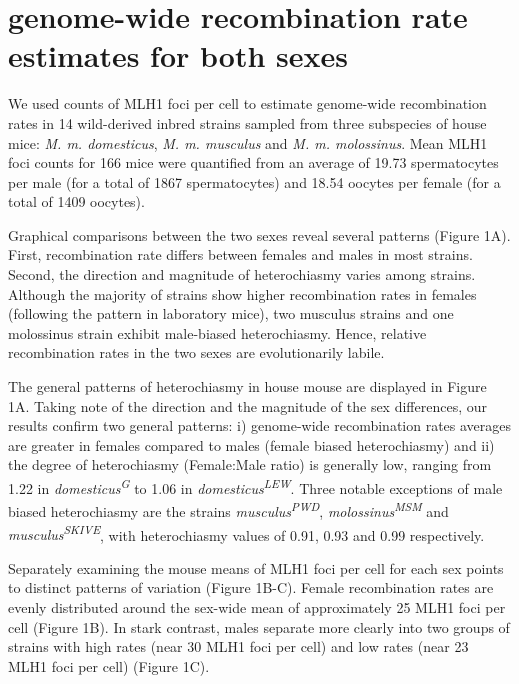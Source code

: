 \documentclass[]{article}
\begin{document}
\section{genome-wide recombination rate estimates for both
sexes}\label{genome-wide-recombination-rate-estimates-for-both-sexes}

We used counts of MLH1 foci per cell to estimate genome-wide
recombination rates in 14 wild-derived inbred strains sampled from three
subspecies of house mice: \emph{M. m. domesticus}, \emph{M. m. musculus}
and \emph{M. m. molossinus}. Mean MLH1 foci counts for 166 mice were
quantified from an average of 19.73 spermatocytes per male (for a total
of 1867 spermatocytes) and 18.54 oocytes per female (for a total of 1409
oocytes).

Graphical comparisons between the two sexes reveal several patterns
(Figure 1A). First, recombination rate differs between females and males
in most strains. Second, the direction and magnitude of heterochiasmy
varies among strains. Although the majority of strains show higher
recombination rates in females (following the pattern in laboratory
mice), two musculus strains and one molossinus strain exhibit
male-biased heterochiasmy. Hence, relative recombination rates in the
two sexes are evolutionarily labile.

The general patterns of heterochiasmy in house mouse are displayed in
Figure 1A. Taking note of the direction and the magnitude of the sex
differences, our results confirm two general patterns: i) genome-wide
recombination rates averages are greater in females compared to males
(female biased heterochiasmy) and ii) the degree of heterochiasmy
(Female:Male ratio) is generally low, ranging from 1.22 in
\emph{domesticus\textsuperscript{G}} to 1.06 in
\emph{domesticus\textsuperscript{LEW}}. Three notable exceptions of male
biased heterochiasmy are the strains
\emph{musculus\textsuperscript{PWD}},
\emph{molossinus\textsuperscript{MSM}} and
\emph{musculus\textsuperscript{SKIVE}}, with heterochiasmy values of
0.91, 0.93 and 0.99 respectively.

Separately examining the mouse means of MLH1 foci per cell for each sex
points to distinct patterns of variation (Figure 1B-C). Female
recombination rates are evenly distributed around the sex-wide mean of
approximately 25 MLH1 foci per cell (Figure 1B). In stark contrast,
males separate more clearly into two groups of strains with high rates
(near 30 MLH1 foci per cell) and low rates (near 23 MLH1 foci per cell)
(Figure 1C).
\end{document}
